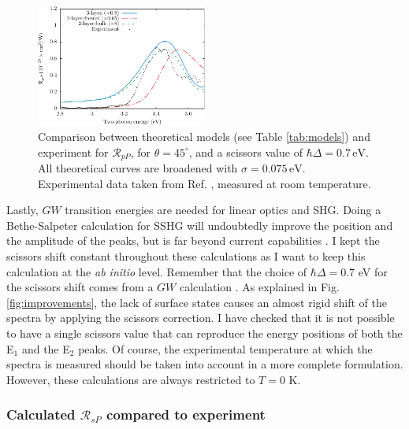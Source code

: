 \begin{figure}[H]
\centering
\includegraphics[width=0.5\textwidth]{content/figures/fig-Si1x1-Mitchell_RpP}
\caption{Comparison between theoretical models (see Table \ref{tab:models}) and
experiment for $\mathcal{R}_{pP}$, for $\theta=45^{\circ}$, and a scissors
value of $\hbar\Delta = 0.7\,\text{eV}$. All theoretical curves are broadened
with $\sigma=0.075\,\text{eV}$. Experimental data taken from Ref.
\cite{mitchellSS01}, measured at room temperature.}
\label{fig:mitchellRpP}
\end{figure}

Lastly, $GW$ transition energies are needed for linear optics and SHG. Doing a
Bethe-Salpeter calculation for SSHG will undoubtedly improve the position and
the amplitude of the peaks, but is far beyond current capabilities \cite{puff}.
I kept the scissors shift constant throughout these calculations as I want to
keep this calculation at the {\em ab initio} level. Remember that the choice of
$\hbar\Delta=0.7$ eV for the scissors shift comes from a $GW$ calculation
\cite{liPRB10}. As explained in Fig. \ref{fig:improvements}, the lack of surface
states causes an almost rigid shift of the spectra by applying the scissors
correction. I have checked that it is not possible to have a single scissors
value that can reproduce the energy positions of both the E$_{1}$ and the
E$_{2}$ peaks. Of course, the experimental temperature at which the spectra is
measured should be taken into account in a more complete formulation. However,
these calculations are always restricted to $T=0$ K.



\subsubsection{Calculated \texorpdfstring{$\mathcal{R}_{sP}$}{RsP} compared to 
experiment}\label{sec:1x1RsP}

